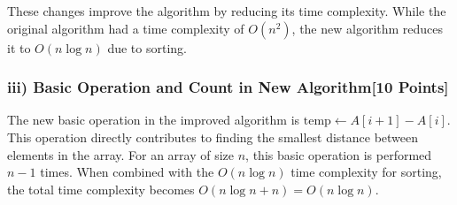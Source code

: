 \documentclass[12pt]{article}
\begin{document}
These changes improve the algorithm by reducing its time complexity. While the original algorithm had a time complexity of \(O(n^2)\), the new algorithm reduces it to \(O(n \log n)\) due to sorting.

\subsubsection*{iii) Basic Operation and Count in New Algorithm[10 Points]}
The new basic operation in the improved algorithm is \( \text{temp} \leftarrow A[i+1] - A[i] \). This operation directly contributes to finding the smallest distance between elements in the array.
\newline\newline
For an array of size \(n\), this basic operation is performed \(n-1\) times. When combined with the \(O(n \log n)\) time complexity for sorting, the total time complexity becomes \(O(n \log n + n) = O(n \log n)\).
\end{document}
